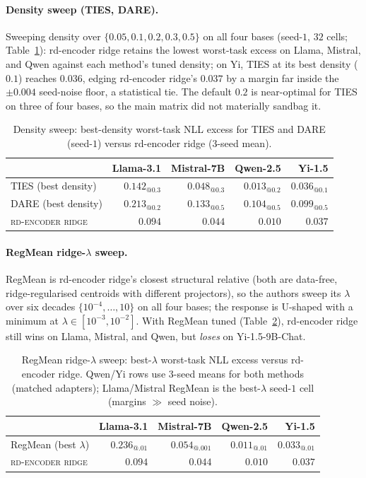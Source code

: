 \paragraph{Density sweep (TIES, DARE).} Sweeping density over
$\{0.05, 0.1, 0.2, 0.3, 0.5\}$ on all four bases (seed-$1$, $32$
cells; Table~\ref{tab:density-sweep}): rd-encoder ridge retains the
lowest worst-task excess on Llama, Mistral, and Qwen against each
method's tuned density; on Yi, TIES at its best density ($0.1$)
reaches $0.036$, edging rd-encoder ridge's $0.037$ by a margin far
inside the $\pm 0.004$ seed-noise floor, a statistical tie. The
default $0.2$ is near-optimal for TIES on three of four bases, so the
main matrix did not materially sandbag it.

\begin{table}[h]
\centering
\caption{Density sweep: best-density worst-task NLL excess for TIES
and DARE (seed-$1$) versus rd-encoder ridge ($3$-seed mean).}
\label{tab:density-sweep}
\begin{tabular}{lrrrr}
\hline
 & Llama-3.1 & Mistral-7B & Qwen-2.5 & Yi-1.5 \\
\hline
TIES (best density)       & $0.142_{@0.3}$ & $0.048_{@0.3}$ & $0.013_{@0.2}$ & $0.036_{@0.1}$ \\
DARE (best density)       & $0.213_{@0.2}$ & $0.133_{@0.5}$ & $0.104_{@0.5}$ & $0.099_{@0.5}$ \\
\textsc{rd-encoder ridge} & $\mathbf{0.094}$ & $\mathbf{0.044}$ & $\mathbf{0.010}$ & $0.037$ \\
\hline
\end{tabular}
\end{table}

\paragraph{RegMean ridge-$\lambda$ sweep.} RegMean is rd-encoder
ridge's closest structural relative (both are data-free,
ridge-regularised centroids with different projectors), so the authors sweep
its $\lambda$ over six decades $\{10^{-4}, \dots, 10\}$ on all four
bases; the response is U-shaped with a minimum at
$\lambda \in [10^{-3}, 10^{-2}]$. With RegMean tuned
(Table~\ref{tab:regmean-lambda}), rd-encoder ridge still wins on
Llama, Mistral, and Qwen, but \emph{loses} on Yi-1.5-9B-Chat.

\begin{table}[h]
\centering
\caption{RegMean ridge-$\lambda$ sweep: best-$\lambda$ worst-task NLL
excess versus rd-encoder ridge. Qwen/Yi rows use $3$-seed means for
both methods (matched adapters); Llama/Mistral RegMean is the
best-$\lambda$ seed-$1$ cell (margins $\gg$ seed noise).}
\label{tab:regmean-lambda}
\begin{tabular}{lrrrr}
\hline
 & Llama-3.1 & Mistral-7B & Qwen-2.5 & Yi-1.5 \\
\hline
RegMean (best $\lambda$)  & $0.236_{@.01}$ & $0.054_{@.001}$ & $0.011_{@.01}$ & $\mathbf{0.033}_{@.01}$ \\
\textsc{rd-encoder ridge} & $\mathbf{0.094}$ & $\mathbf{0.044}$ & $\mathbf{0.010}$ & $0.037$ \\
\hline
\end{tabular}
\end{table}

